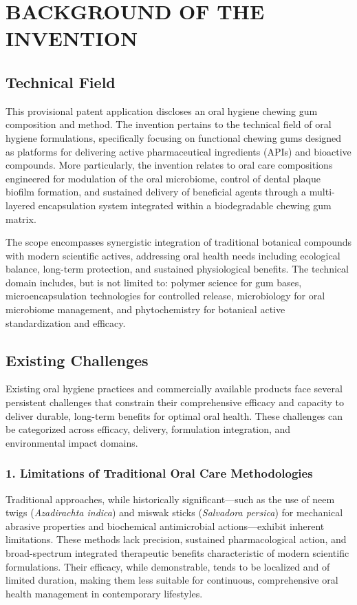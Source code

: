 \documentclass[12pt]{article}
\begin{document}
\linenumbers
\section*{BACKGROUND OF THE INVENTION}

\subsection*{Technical Field}
This provisional patent application discloses an oral hygiene chewing gum composition and method. The invention pertains to the technical field of oral hygiene formulations, specifically focusing on functional chewing gums designed as platforms for delivering active pharmaceutical ingredients (APIs) and bioactive compounds. More particularly, the invention relates to oral care compositions engineered for modulation of the oral microbiome, control of dental plaque biofilm formation, and sustained delivery of beneficial agents through a multi-layered encapsulation system integrated within a biodegradable chewing gum matrix.

The scope encompasses synergistic integration of traditional botanical compounds with modern scientific actives, addressing oral health needs including ecological balance, long-term protection, and sustained physiological benefits. The technical domain includes, but is not limited to: polymer science for gum bases, microencapsulation technologies for controlled release, microbiology for oral microbiome management, and phytochemistry for botanical active standardization and efficacy.

\subsection*{Existing Challenges}
Existing oral hygiene practices and commercially available products face several persistent challenges that constrain their comprehensive efficacy and capacity to deliver durable, long-term benefits for optimal oral health. These challenges can be categorized across efficacy, delivery, formulation integration, and environmental impact domains.

\subsubsection*{1. Limitations of Traditional Oral Care Methodologies}
Traditional approaches, while historically significant---such as the use of neem twigs (\textit{Azadirachta indica}) and miswak sticks (\textit{Salvadora persica}) for mechanical abrasive properties and biochemical antimicrobial actions---exhibit inherent limitations. These methods lack precision, sustained pharmacological action, and broad-spectrum integrated therapeutic benefits characteristic of modern scientific formulations. Their efficacy, while demonstrable, tends to be localized and of limited duration, making them less suitable for continuous, comprehensive oral health management in contemporary lifestyles.
\end{document}
